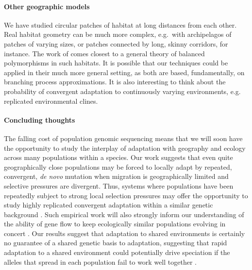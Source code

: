 \documentclass{article}
\newcommand{\citep}[1]{\cite{#1}}
\newcommand{\citet}[1]{\cite{#1}}
\begin{document}
\paragraph{Other geographic models}
We have studied circular patches of habitat at long distances from each other.
Real habitat geometry can be much more complex,
e.g.\ with archipelagos of patches of varying sizes, 
or patches connected by long, skinny corridors, for instance.
The work of \citet{cantrell1991diffusive} comes closest to a general theory of balanced polymorphisms in such habitats.
It is possible that our techniques could be applied in their much more general setting,
as both are based, fundamentally, on branching process approximations.
It is also interesting to think about the probability of convergent
adaptation to continuously varying environments, e.g. replicated
environmental clines.

\paragraph{Concluding thoughts}
The falling cost of population genomic sequencing means that we will soon have the
opportunity to study the interplay of adaptation with geography and ecology 
across many populations within a species. 
Our work suggests that even quite geographically close populations 
may be forced to locally adapt by repeated, convergent, \textit{de novo} mutation 
when migration is geographically limited
and selective pressures are divergent.
Thus, systems where populations have been repeatedly subject to 
strong local selection pressures may offer the opportunity 
to study highly replicated convergent adaptation within a similar
genetic background \citep{stern2013genetic}.  
Such empirical work will also strongly inform our understanding of the
ability of gene flow to keep ecologically similar populations evolving
in concert \citep{sexton2013genetic}.
Our results suggest that adaptation to shared environments is
certainly no guarantee of a shared genetic basis to adaptation, 
suggesting that rapid adaptation to a shared environment could potentially drive
speciation if the alleles that spread in each population fail to work
well together \citep{Kondrashov:03}. 


\end{document}
